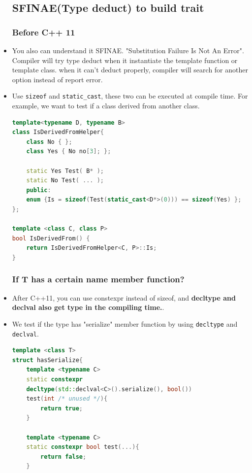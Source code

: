 \documentclass[a4paper,11pt,twoside]{book}
\begin{document}
\begin{itemize}
\subsection{SFINAE(Type deduct) to build trait}
\subsubsection{Before C++ 11}

	\item You also can understand it SFINAE. "Substitution Failure Is Not An Error". Compiler will try type deduct when it instantiate the template function or template class. when it can't deduct properly, compiler will search for another option instead of report error. 
	
	\item Use \texttt{sizeof} and \texttt{static\_cast}, these two can be executed at compile time. For example, we want to test if a class derived from another class.
\begin{lstlisting}[frame=single, language=c++]
template<typename D, typename B>
class IsDerivedFromHelper{
	class No { };
	class Yes { No no[3]; };
	
	static Yes Test( B* );
	static No Test( ... );
	public:
	enum {Is = sizeof(Test(static_cast<D*>(0))) == sizeof(Yes) };
};
	
template <class C, class P> 
bool IsDerivedFrom() {
	return IsDerivedFromHelper<C, P>::Is;
}
\end{lstlisting}

\subsubsection{If T has a certain name member function?}
	
	\item After C++11, you can use constexpr instead of sizeof, and \textbf{decltype and declval also get type in the compiling time.}. 
	
	
	\item We test if the type has "serialize" member function by using \texttt{decltype} and \texttt{declval}.
	
\begin{lstlisting}[frame=single, language=c++]
template <class T> 
struct hasSerialize{
	template <typename C>
	static constexpr 
	decltype(std::declval<C>().serialize(), bool())
	test(int /* unused */){
		return true;
	}

	template <typename C>
	static constexpr bool test(...){
		return false;
	}
	

\end{lstlisting}
\end{itemize}
\end{document}
